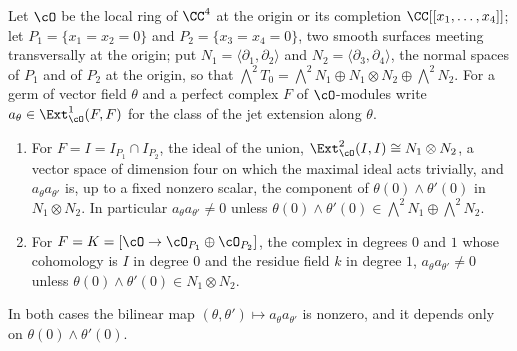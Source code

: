 \begin{lemma}\label{lem:localproducts}
Let $\cO$ be the local ring of $\CC^{4}$ at the origin or its completion
$\CC[[x_{1},\dots,x_{4}]]$; let $P_{1}=\{x_{1}=x_{2}=0\}$ and
$P_{2}=\{x_{3}=x_{4}=0\}$, two smooth surfaces meeting transversally at the
origin; put $N_{1}=\langle\partial_{1},\partial_{2}\rangle$ and
$N_{2}=\langle\partial_{3},\partial_{4}\rangle$, the normal spaces of $P_{1}$
and of $P_{2}$ at the origin, so that
$\bigwedge^{2}T_{0}=\bigwedge^{2}N_{1}\oplus N_{1}\otimes N_{2}\oplus\bigwedge^{2}N_{2}$.
For a germ of vector field $\theta$ and a perfect complex $F$ of
$\cO$-modules write $a_{\theta}\in\Ext^{1}_{\cO}(F,F)$ for the class of the
jet extension along $\theta$.
\begin{enumerate}[label=\textup{(\roman*)},nosep]
\item For $F=I=I_{P_{1}}\cap I_{P_{2}}$, the ideal of the union,
  $\Ext^{2}_{\cO}(I,I)\cong N_{1}\otimes N_{2}$, a vector space of dimension
  four on which the maximal ideal acts trivially, and
  $a_{\theta}a_{\theta'}$ is, up to a fixed nonzero scalar, the component of
  $\theta(0)\wedge\theta'(0)$ in $N_{1}\otimes N_{2}$. In particular
  $a_{\theta}a_{\theta'}\ne0$ unless $\theta(0)\wedge\theta'(0)\in
  \bigwedge^{2}N_{1}\oplus\bigwedge^{2}N_{2}$.
\item For $F=K=[\cO\to\cO_{P_{1}}\oplus\cO_{P_{2}}]$, the complex in degrees
  $0$ and $1$ whose cohomology is $I$ in degree $0$ and the residue field $k$
  in degree $1$, $a_{\theta}a_{\theta'}\ne0$ unless
  $\theta(0)\wedge\theta'(0)\in N_{1}\otimes N_{2}$.
\end{enumerate}
In both cases the bilinear map $(\theta,\theta')\mapsto a_{\theta}a_{\theta'}$
is nonzero, and it depends only on $\theta(0)\wedge\theta'(0)$.
\end{lemma}

